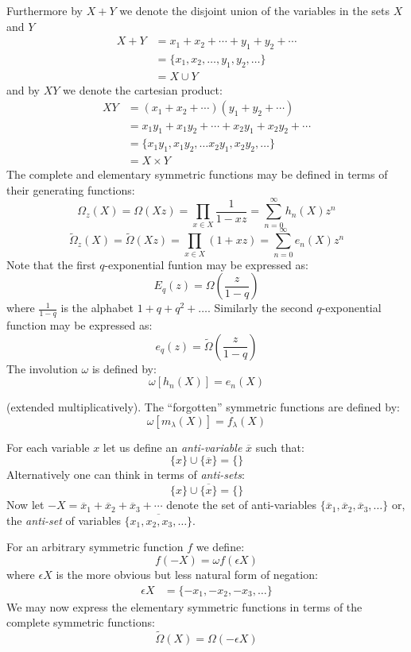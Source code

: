 \documentclass[12pt,dvips]{amsart}
\begin{document}
Furthermore by $X+Y$ we denote the disjoint union of the variables in the sets $X$ and $Y$ 
\begin{align*}
X + Y & =  x_1 + x_2 + \cdots + y_1 + y_2 + \cdots \\
& =  \{x_1, x_2, \ldots, y_1, y_2, \ldots \} \\
& =  X \cup Y
\end{align*}
and by $XY$ we denote the cartesian product:
\begin{align*}
XY & =  (x_1 + x_2 + \cdots)(y_1 + y_2 + \cdots) \\
   & =  x_1 y_1 + x_1 y_2  + \cdots + x_2 y_1 + x_2 y_2 + \cdots \\
   & =  \{x_1 y_1, x_1 y_2, \ldots x_2 y_1, x_2 y_2, \ldots \} \\
   & =  X \times Y
\end{align*}
The complete and elementary symmetric functions may be defined in terms of their generating functions:
$$ \Omega_z(X) = \Omega(Xz) = \prod_{x \in X} \frac{1}{1-xz} = \sum_{n=0}^\infty h_n(X) z^n $$
$$ \tilde{\Omega}_z(X) = \tilde{\Omega}(Xz) = \prod_{x \in X}(1+xz) = \sum_{n=0}^\infty e_n(X) z^n $$
Note that the first $q$-exponential funtion may be expressed as:
$$ E_q(z) = \Omega\left ( \frac{z}{1-q} \right ) $$
where $\frac{1}{1-q}$ is the alphabet $1 + q + q^2 + \dots $.
Similarly the second $q$-exponential function may be expressed as:
$$ e_q(z) = \tilde{\Omega}\left ( \frac{z}{1-q} \right ) $$
\noindent
The involution $\omega$ is defined by:
$$ \omega[h_n(X)] = e_n(X) $$

(extended multiplicatively). The ``forgotten'' symmetric functions are defined by:
$$ \omega[m_\lambda(X)] = f_\lambda(X) $$

\par\bigskip
For each variable $x$ let us define an {\it anti-variable} $\overline{x}$ such that:
$$ \{x\} \cup \{ \overline{x} \} = \{ \}$$
Alternatively one can think in terms of {\it anti-sets}:
$$ \{x\} \cup \overline{ \{ x \} } = \{ \}$$
Now let
$-X = \overline{x}_1 + \overline{x}_2 + \overline{x}_3 + \cdots $
denote the set of anti-variables
$ \{ \overline{x}_1, \overline{x}_2,\overline{x}_3, \ldots \} $
or, the {\it anti-set} of variables
$ \overline{\{x_1, x_2, x_3, \ldots \}}$.

\par\bigskip
For an arbitrary symmetric function $f$ we define:
$$ f(-X) = \omega f(\epsilon X) $$
where $\epsilon X$ is the more obvious but less natural form of negation:
\begin{align*}
\epsilon X & = \{-x_1, -x_2, -x_3, \ldots \}
\end{align*}
We may now express the elementary symmetric functions in terms of the complete symmetric functions:
$$ \tilde{\Omega}(X) = \Omega(-\epsilon X) $$
\end{document}
